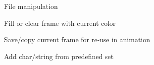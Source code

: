 \documentclass[11pt]{article} %
\begin{document}
{\begin{figure}[H]
	\centering
	\caption{File manipulation}
	\label{fig:UC1}
\end{figure}
\begin{figure}[H]
	\centering
	\caption{Fill or clear frame with current color}
	\label{fig:UC2}
\end{figure}
\begin{figure}[H]
	\centering
	\caption{Save/copy current frame for re-use in animation}
	\label{fig:UC3}
\end{figure}

\begin{figure}[H]
	\centering
	\caption{Add char/string from predefined set}
	\label{fig:UC4}
\end{figure}

}
\end{document}
